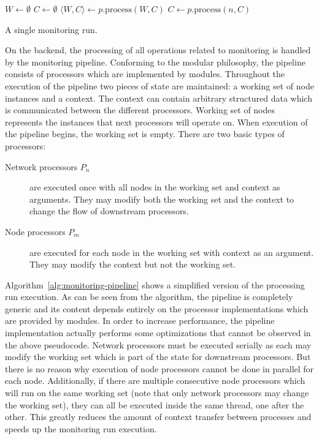 \documentclass[5p,sort&compress]{elsarticle}
\begin{document}
\begin{algorithm}[t]
\begin{algorithmic}
  \State $W \gets \emptyset$
  \State $C \gets \emptyset$
      \State $\langle W, C \rangle \gets p.\mathrm{process}(W, C)$
        \State $C \gets p.\mathrm{process}(n, C)$
      \EndFor
    \EndIf
  \EndFor
\EndProcedure
\end{algorithmic}
\caption{A single monitoring run.}
\label{alg:monitoring-pipeline}
\end{algorithm}

On the backend, the processing of all operations related to monitoring is handled by the monitoring pipeline.
Conforming to the modular philosophy, the pipeline consists of processors which are implemented by modules.
Throughout the execution of the pipeline two pieces of state are maintained: a working set of node instances and a context.
The context can contain arbitrary structured data which is communicated between the different processors.
Working set of nodes represents the instances that next processors will operate on.
When execution of the pipeline begins, the working set is empty.
There are two basic types of processors:
\begin{description}
\item[Network processors $P_n$] are executed once with all nodes in the working set and context as arguments. They may modify both the working set and the context to change the flow of downstream processors.

\item[Node processors $P_m$] are executed for each node in the working set with context as an argument. They may modify the context but not the working set.
\end{description}

Algorithm~\ref{alg:monitoring-pipeline} shows a simplified version of the processing run execution.
As can be seen from the algorithm, the pipeline is completely generic and its content depends entirely on the processor implementations which are provided by modules.
In order to increase performance, the pipeline implementation actually performs some optimizations that cannot be observed in the above pseudocode.
Network processors must be executed serially as each may modify the working set which is part of the state for downstream processors.
But there is no reason why execution of node processors cannot be done in parallel for each node.
Additionally, if there are multiple consecutive node processors which will run on the same working set (note that only network processors may change the working set), they can all be executed inside the same thread, one after the other.
This greatly reduces the amount of context transfer between processes and speeds up the monitoring run execution.
\end{document}
